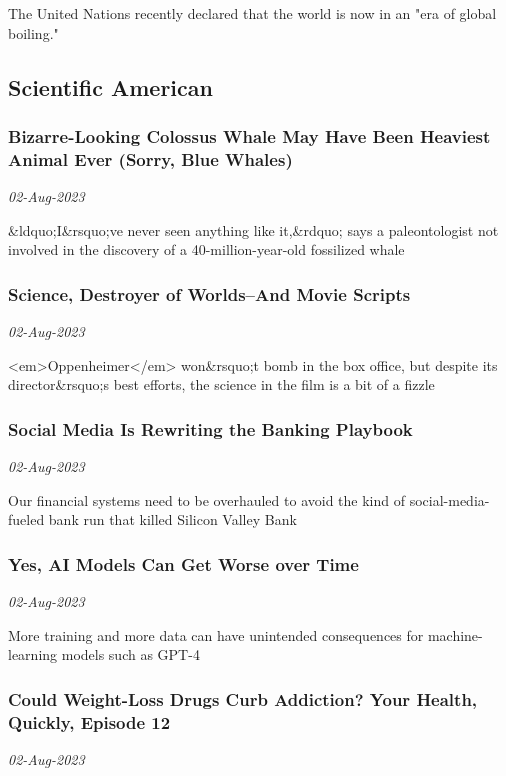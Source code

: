 The United Nations recently declared that the world is now in an "era of global boiling."
\subsection{Scientific American \href{https://www.scientificamerican.com/}{}}
\subsubsection{Bizarre-Looking Colossus Whale May Have Been Heaviest Animal Ever (Sorry, Blue Whales) \href{https://www.scientificamerican.com/article/bizarre-looking-colossus-whale-may-have-been-heaviest-animal-ever-sorry-blue-whales/}{}}
\textit{02-Aug-2023}

\&ldquo;I\&rsquo;ve never seen anything like it,\&rdquo; says a paleontologist not involved in the discovery of a 40-million-year-old fossilized whale
\subsubsection{Science, Destroyer of Worlds--And Movie Scripts \href{https://www.scientificamerican.com/article/science-destroyer-of-worlds-and-movie-scripts/}{}}
\textit{02-Aug-2023}

<em>Oppenheimer</em> won\&rsquo;t bomb in the box office, but despite its director\&rsquo;s best efforts, the science in the film is a bit of a fizzle
\subsubsection{Social Media Is Rewriting the Banking Playbook \href{https://www.scientificamerican.com/article/social-media-is-rewriting-the-banking-playbook/}{}}
\textit{02-Aug-2023}

Our financial systems need to be overhauled to avoid the kind of social-media-fueled bank run that killed Silicon Valley Bank
\subsubsection{Yes, AI Models Can Get Worse over Time \href{https://www.scientificamerican.com/article/yes-ai-models-can-get-worse-over-time/}{}}
\textit{02-Aug-2023}

More training and more data can have unintended consequences for machine-learning models such as GPT-4
\subsubsection{Could Weight-Loss Drugs Curb Addiction? Your Health, Quickly, Episode 12 \href{https://www.scientificamerican.com/podcast/episode/could-weight-loss-drugs-curb-addiction-your-health-quickly-episode-12/}{}}
\textit{02-Aug-2023}

